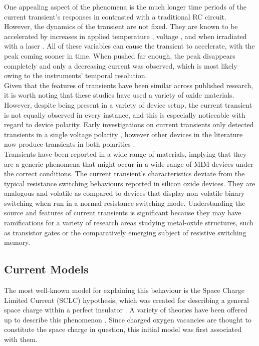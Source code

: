 \noindent One appealing aspect of the phenomena is the much longer time periods of the current transient's responses in contrasted with a traditional RC circuit. However, the dynamics of the transient are not fixed. They are known to be accelerated by increases in applied temperature \cite{manceau2007metal}, voltage \cite{zafar1998oxygen}, and when irradiated with a laser \cite{li2015visible}. All of these variables can cause the transient to accelerate, with the peak coming sooner in time. When pushed far enough, the peak disappears completely and only a decreasing current was observed, which is most likely owing to the instruments' temporal resolution. \\

\noindent Given that the features of transients have been similar across published research, it is worth noting that these studies have used a variety of oxide materials. However, despite being present in a variety of device setup, the current transient is not equally observed in every instance, and this is especially noticeable with regard to device polarity. Early investigations on current transients only detected transients in a single voltage polarity \cite{manceau2007current}, however other devices in the literature now produce transients in both polarities \cite{chen2010observation}. \\

\noindent Transients have been reported in a wide range of materials, implying that they are a generic phenomena that might occur in a wide range of MIM devices under the correct conditions. The current transient's characteristics deviate from the typical resistance switching behaviours reported in silicon oxide devices. They are analogous and volatile as compared to devices that display non-volatile binary switching when run in a normal resistance switching mode. Understanding the source and features of current transients is significant because they may have ramifications for a variety of research areas studying metal-oxide structures, such as transistor gates or the comparatively emerging subject of resistive switching memory.


\subsection[Current Models]{Current Models}
The most well-known model for explaining this behaviour is the Space Charge Limited Current (SCLC) hypothesis, which was created for describing a general space charge within a perfect insulator \cite{many1962theory}. A variety of theories have been offered up to describe this phenomenon \cite{lampert1970current}. Since charged oxygen vacancies are thought to constitute the space charge in question, this initial model was first associated with them. \\

